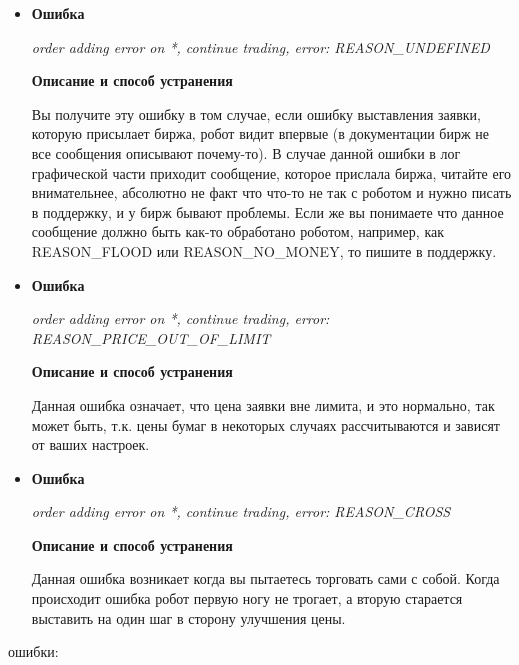 \begin{itemize}
\item \textbf{Ошибка}

\textit{order adding error on *, continue trading, error: REASON\_UNDEFINED}

\textbf{Описание и способ устранения}

Вы получите эту ошибку в том случае, если ошибку выставления заявки, которую присылает биржа, робот видит впервые (в документации бирж не все сообщения описывают почему-то).
В случае данной ошибки в лог графической части приходит сообщение, которое прислала биржа, читайте его внимательнее, абсолютно не факт что что-то не так с роботом и нужно писать
в поддержку, и у бирж бывают проблемы. Если же вы понимаете что данное сообщение должно быть как-то обработано роботом, например, как REASON\_FLOOD или REASON\_NO\_MONEY,
то пишите в поддержку.

\item \textbf{Ошибка}

\textit{order adding error on *, continue trading, error: REASON\_PRICE\_OUT\_OF\_LIMIT}

\textbf{Описание и способ устранения}

Данная ошибка означает, что цена заявки вне лимита, и это нормально, так может быть, т.к. цены бумаг в некоторых случаях рассчитываются и зависят от ваших настроек.

\item \textbf{Ошибка}

\textit{order adding error on *, continue trading, error: REASON\_CROSS}

\textbf{Описание и способ устранения}

Данная ошибка возникает когда вы пытаетесь торговать сами с собой. Когда происходит ошибка робот первую ногу не трогает, а вторую старается выставить на один шаг в сторону улучшения цены.

\end{itemize}

 ошибки:


